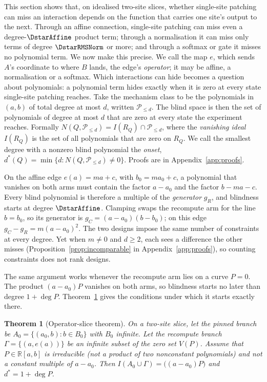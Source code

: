 \documentclass{article}
\theoremstyle{plain}
\newtheorem{theorem}{Theorem}
\theoremstyle{definition}
\begin{document}
This section shows that, on idealised two-site slices, whether single-site patching can miss an interaction depends
on the function that carries one site's output to the next. Through an affine connection, single-site patching can miss even a degree-$\DstarAffine$ product term; through a
normalisation it can miss only terms of degree $\DstarRMSNorm$ or more; and through a softmax or gate it misses no
polynomial term. We now make this
precise. We call the map $e$, which sends $A$'s
coordinate to where $B$ lands, the edge's \emph{operator}; it may be affine,
a normalisation or a softmax. Which interactions can hide becomes a question about polynomials: a polynomial term hides exactly when it is zero at
every state single-site patching reaches. Take the mechanism class to be the polynomials in $(a,b)$ of total degree at most $d$, written $\mathcal P_{\le d}$.
The blind space is then the set of polynomials of degree at most $d$ that are zero at every state the experiment
reaches. Formally $N(Q,\mathcal P_{\le d})=I(R_Q)\cap\mathcal P_{\le d}$, where the \emph{vanishing ideal} $I(R_Q)$
is the set of all polynomials that are zero on $R_Q$. We call the smallest degree with a nonzero blind
polynomial the \emph{onset}, $d^*(Q)=\min\{d:N(Q,\mathcal P_{\le d})\neq0\}$. Proofs are in Appendix~\ref{app:proofs}.

On the affine edge $e(a)=ma+c$, with $b_0=ma_0+c$, a polynomial that vanishes on both arms must contain the factor
$a-a_0$ and the factor $b-ma-c$. Every blind polynomial is therefore a multiple of the \emph{generator} $g_R$, and
blindness starts at degree $\DstarAffine$. Clamping swaps the recompute arm for the line $b=b_0$, so its generator is
$g_C=(a-a_0)(b-b_0)$; on this edge $g_C-g_R=m(a-a_0)^2$. The two designs impose the same number of constraints at every
degree. Yet when $m\neq0$ and $d\ge2$, each sees a difference the other misses
(Proposition~\ref{prop:incomparable} in Appendix~\ref{app:proofs}), so counting constraints does not rank designs.

The same argument works whenever the recompute arm lies on a curve $P=0$. The product $(a-a_0)P$ vanishes on both arms,
so blindness starts no later than degree $1+\deg P$. Theorem~\ref{thm:operator} gives the conditions under which it
starts exactly there.

\begin{theorem}[Operator-slice theorem]
\label{thm:operator}
On a two-site slice, let the pinned branch be $A_0=\{(a_0,b):b\in B_0\}$ with $B_0$ infinite. Let the recompute branch
$\Gamma=\{(a,e(a))\}$ be an infinite subset of the zero set $V(P)$. Assume that $P\in\mathbb R[a,b]$ is irreducible
(not a product of two nonconstant polynomials) and not a constant multiple of $a-a_0$. Then
$I(A_0\cup\Gamma)=\bigl((a-a_0)P\bigr)$ and $d^*=1+\deg P$.
\end{theorem}
\end{document}
